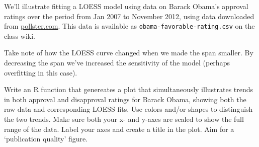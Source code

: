 We'll illustrate fitting a LOESS model using data on Barack Obama's
approval ratings over the period from Jan 2007 to November 2012, using data downloaded from \url{pollster.com}. This data is available as  \lstinline!obama-favorable-rating.csv! on the class wiki.
%
Take note of how the LOESS curve changed when we made the span smaller.
By decreasing the span we've increased the sensitivity of the model
(perhaps overfitting in this case).

\medskip
\begin{assignment}
Write an R function that genereates a plot that
simultaneously illustrates trends in both approval and disapproval
ratings for Barack Obama, showing both the raw data and corresponding
LOESS fits. Use colors and/or shapes to distinguish the two trends. Make
sure both your x- and y-axes are scaled to show the full range of the
data. Label your axes and create a title in the plot. Aim for a
`publication quality' figure.
\end{assignment}

